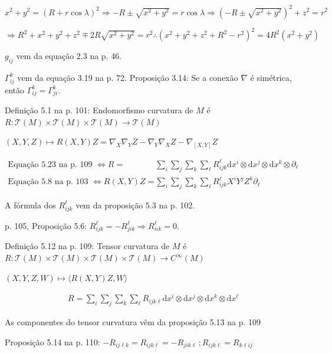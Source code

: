 \documentclass[10pt,a4paper]{article}
\begin{document}
		$x^2 + y^2 = (R + r \cos \lambda)^2 \Rightarrow - R \pm \sqrt{x^2 + y^2} = r \cos \lambda \Rightarrow (- R \pm \sqrt{x^2 + y^2})^2 + z^2 = r^2$

		$\Rightarrow R^2 + x^2 + y^2 + z^2 \mp 2 R \sqrt{x^2 + y^2} = r^2 \therefore (x^2 + y^2 + z^2 + R^2 - r^2)^2 = 4R^2 (x^2 + y^2)$

		$g_{ij}$ vem da equa\c{c}\~ao 2.3 na p. 46.

		$\Gamma_{ij}^k$ vem da equa\c{c}\~ao 3.19 na p. 72. Proposi\c{c}\~ao 3.14: Se a conex\~ao $\nabla$ \'e sim\'etrica, ent\~ao $\Gamma_{ij}^k = \Gamma_{ji}^k$.

		Defini\c{c}\~ao 5.1 na p. 101: Endomorfismo curvatura de $M$ \'e $R : \mathcal{T}(M) \times \mathcal{T}(M) \times \mathcal{T}(M) \rightarrow \mathcal{T}(M)$

		$(X, Y, Z) \mapsto R(X,Y)Z = \nabla_X \nabla_Y Z - \nabla_Y \nabla_X Z - \nabla_{[X,Y]} Z$

		\begin{align*}
		\text{Equa\c{c}\~ao 5.23 na p. 109 } \Leftrightarrow R = &\sum_i \sum_j \sum_k \sum_\ell R_{ijk}^\ell \mathrm{d}x^i \otimes \mathrm{d}x^j \otimes \mathrm{d}x^k \otimes \partial_\ell \\
		\text{Equa\c{c}\~ao 5.8 na p. 103 } \Leftrightarrow R(X,Y)Z = &\sum_i \sum_j \sum_k \sum_\ell R_{ijk}^\ell X^i Y^j Z^k \partial_\ell
		\end{align*}

		A f\'ormula dos $R_{ijk}^\ell$ vem da proposi\c{c}\~ao 5.3 na p. 102.

		p. 105, Proposi\c{c}\~ao 5.6: $R_{ijk}^\ell = -R_{jik}^\ell \Rightarrow R_{iik}^\ell = 0$.

		Defini\c{c}\~ao 5.12 na p. 109: Tensor curvatura de $M$ \'e $R : \mathcal{T}(M) \times \mathcal{T}(M) \times \mathcal{T}(M) \times \mathcal{T}(M) \rightarrow C^\infty(M)$

		$(X, Y, Z, W) \mapsto \langle R(X,Y)Z, W \rangle$

		\begin{align*}
		R = \sum_i \sum_j \sum_k \sum_\ell R_{ijk\ell} \mathrm{d}x^i \otimes \mathrm{d}x^j \otimes \mathrm{d}x^k \otimes \mathrm{d}x^\ell
		\end{align*}

		As componentes do tensor curvatura v\^em da proposi\c{c}\~ao 5.13 na p. 109

		Proposi\c{c}\~ao 5.14 na p. 110: $- R_{ij\ell k} = R_{ijk\ell} = - R_{jik\ell}\,; R_{ijk\ell} = R_{k\ell ij}$
\end{document}
